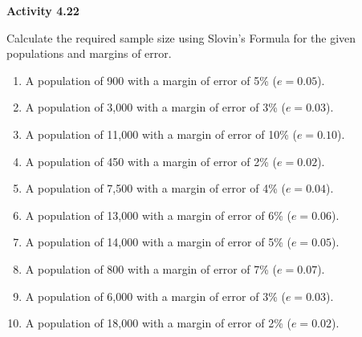 \vspace{0.3ex}
\noindent\textbf{Activity 4.22}

\vspace{0.2ex}

Calculate the required sample size using Slovin’s Formula for the given populations and margins of error. 

\begin{enumerate}
    \item A population of 900 with a margin of error of 5\% (\(e = 0.05\)).
    \item A population of 3,000 with a margin of error of 3\% (\(e = 0.03\)).
    \item A population of 11,000 with a margin of error of 10\% (\(e = 0.10\)).
    \item A population of 450 with a margin of error of 2\% (\(e = 0.02\)).
    \item A population of 7,500 with a margin of error of 4\% (\(e = 0.04\)).
    \item A population of 13,000 with a margin of error of 6\% (\(e = 0.06\)).
    \item A population of 14,000 with a margin of error of 5\% (\(e = 0.05\)).
    \item A population of 800 with a margin of error of 7\% (\(e = 0.07\)).
    \item A population of 6,000 with a margin of error of 3\% (\(e = 0.03\)).
    \item A population of 18,000 with a margin of error of 2\% (\(e = 0.02\)).
\end{enumerate}
